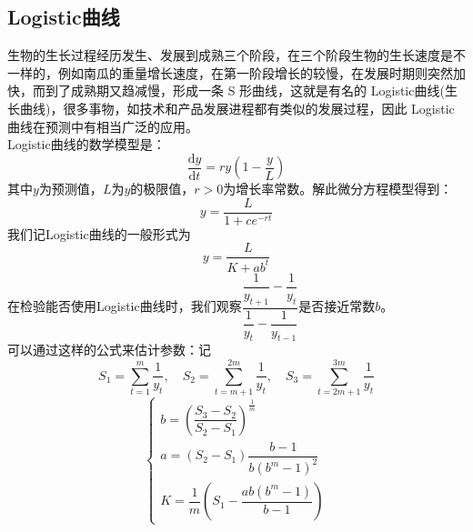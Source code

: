 \documentclass[11pt,a4paper]{article}
\begin{document}
\subsection{Logistic曲线}
生物的生长过程经历发生、发展到成熟三个阶段，在三个阶段生物的生长速度是不一样的，例如南瓜的重量增长速度，在第一阶段增长的较慢，在发展时期则突然加快，而到了成熟期又趋减慢，形成一条 S 形曲线，这就是有名的 Logistic曲线(生长曲线)，很多事物，如技术和产品发展进程都有类似的发展过程，因此 Logistic 曲线在预测中有相当广泛的应用。\\
Logistic曲线的数学模型是：\\
\begin{equation*}
	\dfrac{\mathrm{d}y}{\mathrm{d}t}=ry(1-\dfrac{y}{L})
\end{equation*}
其中$y$为预测值，$L$为$y$的极限值，$r>0$为增长率常数。解此微分方程模型得到：
\begin{equation*}
	y=\dfrac{L}{1+ce^{-rt}}
\end{equation*}
我们记Logistic曲线的一般形式为
\begin{equation*}
	y=\dfrac{L}{K+ab^{t}}
\end{equation*}
在检验能否使用Logistic曲线时，我们观察$\dfrac{\dfrac{1}{y_{t+1}}-\dfrac{1}{y_t}}{\dfrac{1}{y_t}-\dfrac{1}{y_{t-1}}}$是否接近常数$b$。\\
可以通过这样的公式来估计参数：记\\
\begin{equation*}
S_1=\sum\limits_{t=1}^{m}\dfrac{1}{y_t},\quad S_2=\sum\limits_{t=m+1}^{2m}\dfrac{1}{y_t},\quad S_3=\sum\limits_{t=2m+1}^{3m}\dfrac{1}{y_t}
\end{equation*}
\begin{equation*}
	\begin{cases}
	b=(\dfrac{S_3-S_2}{S_2-S_1})^{\frac{1}{m}}\\
	a=(S_2-S_1)\dfrac{b-1}{b(b^m-1)^2}\\
	K=\dfrac{1}{m}(S_1-\dfrac{ab(b^m-1)}{b-1})
	\end{cases}
\end{equation*}
\end{document}
